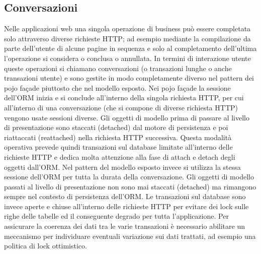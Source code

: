 \subsection{Conversazioni}
Nelle applicazioni web una singola operazione di business può essere completata solo attraverso diverse richieste HTTP; ad esempio mediante la compilazione da parte dell'utente di alcune pagine in sequenza e solo al completamento dell'ultima l'operazione si considera o conclusa o annullata. In termini di interazione utente queste operazioni si chiamano conversazioni (o transazioni lunghe o anche transazioni utente) e sono gestite in modo completamente diverso nel pattern dei pojo façade piuttosto che nel modello esposto.
Nei pojo façade la sessione dell'ORM inizia e si conclude all'interno della singola richiesta HTTP, per cui all'interno di una conversazione (che si compone di diverse richiesta HTTP) vengono usate sessioni diverse. Gli oggetti di modello prima di passare al livello di presentazione sono staccati (detached) dal motore di persistenza  e poi riattaccati (reattached) nella richiesta HTTP successiva. Questa modalità operativa prevede quindi transazioni sul database limitate all'interno delle richieste HTTP e dedica molta attenzione alla fase di attach e detach degli oggetti dall'ORM.
Nel pattern del modello esposto invece si utilizza la stessa sessione dell'ORM per tutta la durata della conversazione. Gli oggetti di modello passati al livello di presentazione non sono mai staccati (detached) ma rimangono sempre nel contesto di persistenza dell'ORM. Le transazioni sul database sono invece aperte e chiuse all'interno delle richieste HTTP per evitare dei lock sulle righe delle tabelle ed il conseguente degrado per tutta l'applicazione. Per assicurare la coerenza dei dati tra le varie transazioni è necessario abilitare un meccanismo per individuare eventuali variazione sui dati trattati, ad esempio una politica di lock ottimistico. 

